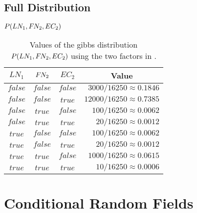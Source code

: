 \subsection{Full Distribution}\label{app:subsec-gd-full-distribution}
\begin{table}[H]
\centering
$P(LN_1,F\hspace{-0.07em} N_2,EC_2)$\par
\smallskip
\begin{tabular}{c c c r}
 \toprule
 $LN_1$ & $F\hspace{-0.07em} N_2$ & $EC_2$ & \multicolumn{1}{c}{Value} \\
 \midrule
 $\mathit{false}$ & $\mathit{false}$ & $\mathit{false}$ & $\num{3000}/\num{16250}\approx0.1846$\\
 $\mathit{false}$ & $\mathit{false}$ & $\mathit{true}$  & $\num{12000}/\num{16250}\approx0.7385$\\
 $\mathit{false}$ & $\mathit{true}$  & $\mathit{false}$ & $\num{100}/\num{16250}\approx0.0062$\\
 $\mathit{false}$ & $\mathit{true}$  & $\mathit{true}$  & $\num{20}/\num{16250}\approx0.0012$\\
 $\mathit{true}$  & $\mathit{false}$ & $\mathit{false}$ & $\num{100}/\num{16250}\approx0.0062$\\
 $\mathit{true}$  & $\mathit{false}$ & $\mathit{true}$  & $\num{20}/\num{16250}\approx0.0012$\\
 $\mathit{true}$  & $\mathit{true}$  & $\mathit{false}$ & $\num{1000}/\num{16250}\approx0.0615$\\
 $\mathit{true}$  & $\mathit{true}$  & $\mathit{true}$  & $\num{10}/\num{16250}\approx0.0006$\\
 \bottomrule
\end{tabular}
\caption{Values of the \Gls{gibbs distribution} $P(LN_1,F\hspace{-0.07em} N_2,EC_2)$ using the two \glspl{factor} in .}
\label{tab:example-factor-product}
\end{table}
\section{Conditional Random Fields}\label{app:sec-conditional-random-fields}
